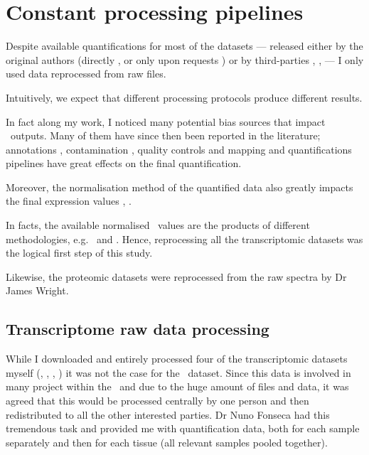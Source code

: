 \section{Constant processing pipelines}

Despite available quantifications for most of the datasets ---
released either by the original authors (directly \citep{Krupp2012},
\citep{Uhlen2015} or  only upon requests \citep{PandeyData})
or by third-parties \citep{BioGPS1}, \citep{EBIgxa},
\citep{Harmonizome} --- I only used data reprocessed from raw files.

Intuitively, we expect that different processing protocols produce
different results.

In fact along my work, I noticed many potential bias sources that impact
\Rnaseq\ outputs. Many of them have since then been reported in the literature;
annotations \citep{annotationDiff},
contamination \citep{contaminationRNAseq},
quality controls \citep{qualityRNAseq} and
mapping and quantifications pipelines \citep{Fonseca2014}
have great effects on the final quantification.

Moreover, the normalisation method of the quantified data also
greatly impacts the final expression values
\citep{Dillies2013}, \citep{normalisation2}.

In facts, the available normalised \Rnaseq\ values are the products
of different methodologies, e.g.\ \citep{GTExTranscript} and \citep{Krupp2012}.
Hence, reprocessing all the transcriptomic datasets was the logical
first step of this study.

Likewise, the proteomic datasets were reprocessed from the raw spectra by Dr
James Wright.


\subsection{Transcriptome raw data processing}

While I downloaded and entirely processed four of the transcriptomic datasets
myself (,
,
,
)
it was not the case for the \Gtex\ dataset. Since this
data is involved in many project within the \EBI\ and due to the huge amount of
files and data,
it was agreed that this would be processed centrally by one person and then
redistributed to all the other interested parties. Dr Nuno Fonseca had this
tremendous task and provided me with quantification data,
both for each sample separately and then for each tissue (all relevant samples
pooled together).

